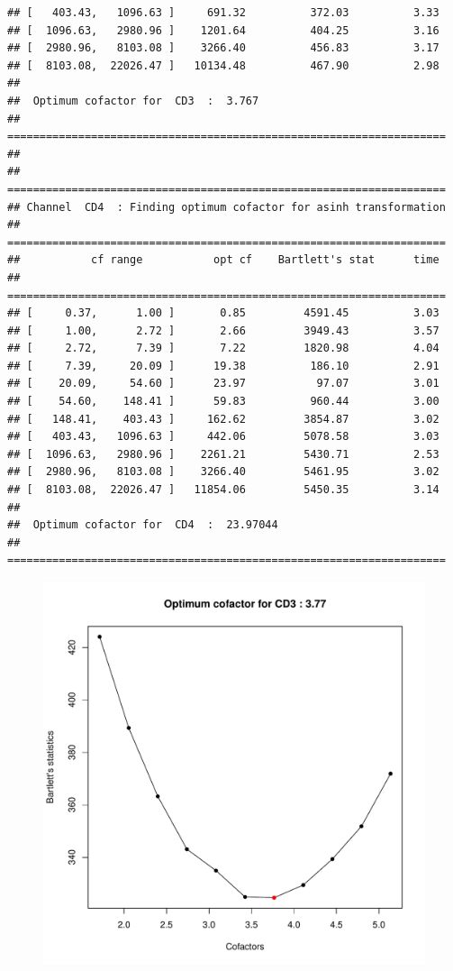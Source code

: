 \documentclass{article}\usepackage[]{graphicx}\usepackage[]{color}
\makeatletter
\newenvironment{kframe}{%
 \def\at@end@of@kframe{}%
 \ifinner\ifhmode%
  \def\at@end@of@kframe{\end{minipage}}%
  \begin{minipage}{\columnwidth}%
 \fi\fi%
 \def\FrameCommand##1{\hskip\@totalleftmargin \hskip-\fboxsep
 \colorbox{shadecolor}{##1}\hskip-\fboxsep
     \hskip-\linewidth \hskip-\@totalleftmargin \hskip\columnwidth}%
 \MakeFramed {\advance\hsize-\width
   \@totalleftmargin\z@ \linewidth\hsize
   \@setminipage}}%
 {\par\unskip\endMakeFramed%
 \at@end@of@kframe}
\newenvironment{knitrout}{}{} %
\makeatother
\begin{document}
\begin{knitrout}
\begin{kframe}
\begin{verbatim}
## [   403.43,   1096.63 ]     691.32          372.03          3.33 
## [  1096.63,   2980.96 ]    1201.64          404.25          3.16 
## [  2980.96,   8103.08 ]    3266.40          456.83          3.17 
## [  8103.08,  22026.47 ]   10134.48          467.90          2.98
## 
##  Optimum cofactor for  CD3  :  3.767 
## ====================================================================
## 
## ====================================================================
## Channel  CD4  : Finding optimum cofactor for asinh transformation
## ====================================================================
##           cf range           opt cf    Bartlett's stat      time 
## ====================================================================
## [     0.37,      1.00 ]       0.85         4591.45          3.03 
## [     1.00,      2.72 ]       2.66         3949.43          3.57 
## [     2.72,      7.39 ]       7.22         1820.98          4.04 
## [     7.39,     20.09 ]      19.38          186.10          2.91 
## [    20.09,     54.60 ]      23.97           97.07          3.01 
## [    54.60,    148.41 ]      59.83          960.44          3.00 
## [   148.41,    403.43 ]     162.62         3854.87          3.02 
## [   403.43,   1096.63 ]     442.06         5078.58          3.03 
## [  1096.63,   2980.96 ]    2261.21         5430.71          2.53 
## [  2980.96,   8103.08 ]    3266.40         5461.95          3.02 
## [  8103.08,  22026.47 ]   11854.06         5450.35          3.14
## 
##  Optimum cofactor for  CD4  :  23.97044 
## ====================================================================
\end{verbatim}
\end{kframe}\begin{figure}
\includegraphics[width=.49\linewidth]{figure/ITN-1} 

\end{figure}
\end{knitrout}
\end{document}
